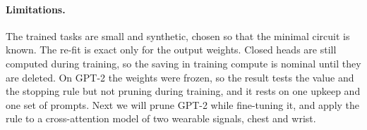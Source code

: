 \documentclass[letterpaper]{article} %
\begin{document}
\paragraph{Limitations.} The trained tasks are small and synthetic, chosen so that the minimal circuit is known. The re-fit is exact only for the output weights. Closed heads are still computed during training, so the saving in training compute is nominal until they are deleted. On GPT-2 the weights were frozen, so the result tests the value and the stopping rule but not pruning during training, and it rests on one upkeep and one set of prompts. Next we will prune GPT-2 while fine-tuning it, and apply the rule to a cross-attention model of two wearable signals, chest and wrist.


\end{document}
